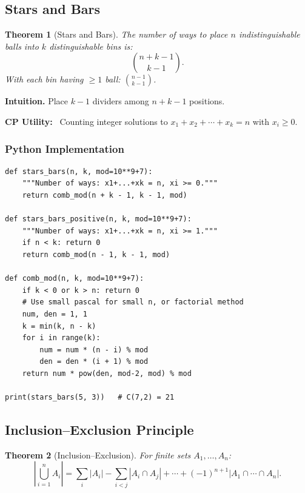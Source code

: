 \documentclass[10pt,a4paper]{article}
\theoremstyle{cpstyle}
\newtheorem{theorem}{Theorem}[section]
\newenvironment{cputility}{%
  \begin{mdframed}[backgroundcolor=theorembg, linecolor=accent!50, linewidth=1pt,
    innerleftmargin=10pt, innerrightmargin=10pt, innertopmargin=6pt, innerbottommargin=6pt]
  \textbf{\color{accent}CP Utility:}~}{%
  \end{mdframed}}
\begin{document}
\subsection{Stars and Bars}

\begin{theorem}[Stars and Bars]
The number of ways to place $n$ indistinguishable balls into $k$ distinguishable bins is:
\[
  \binom{n+k-1}{k-1}.
\]
With each bin having $\geq 1$ ball: $\binom{n-1}{k-1}$.
\end{theorem}

\textbf{Intuition.} Place $k-1$ dividers among $n+k-1$ positions.

\begin{cputility}
Counting integer solutions to $x_1+x_2+\cdots+x_k = n$ with $x_i \geq 0$.
\end{cputility}

\subsubsection{Python Implementation}
\begin{lstlisting}[caption={Stars and Bars -- non-negative and positive integer solutions}]
def stars_bars(n, k, mod=10**9+7):
    """Number of ways: x1+...+xk = n, xi >= 0."""
    return comb_mod(n + k - 1, k - 1, mod)

def stars_bars_positive(n, k, mod=10**9+7):
    """Number of ways: x1+...+xk = n, xi >= 1."""
    if n < k: return 0
    return comb_mod(n - 1, k - 1, mod)

def comb_mod(n, k, mod=10**9+7):
    if k < 0 or k > n: return 0
    # Use small pascal for small n, or factorial method
    num, den = 1, 1
    k = min(k, n - k)
    for i in range(k):
        num = num * (n - i) % mod
        den = den * (i + 1) % mod
    return num * pow(den, mod-2, mod) % mod

print(stars_bars(5, 3))   # C(7,2) = 21
\end{lstlisting}

\subsection{Inclusion--Exclusion Principle}

\begin{theorem}[Inclusion--Exclusion]
For finite sets $A_1, \ldots, A_n$:
\[
  \left|\bigcup_{i=1}^n A_i\right| = \sum_{i}|A_i| - \sum_{i<j}|A_i \cap A_j| + \cdots + (-1)^{n+1}|A_1\cap\cdots\cap A_n|.
\]
\end{theorem}
\end{document}
